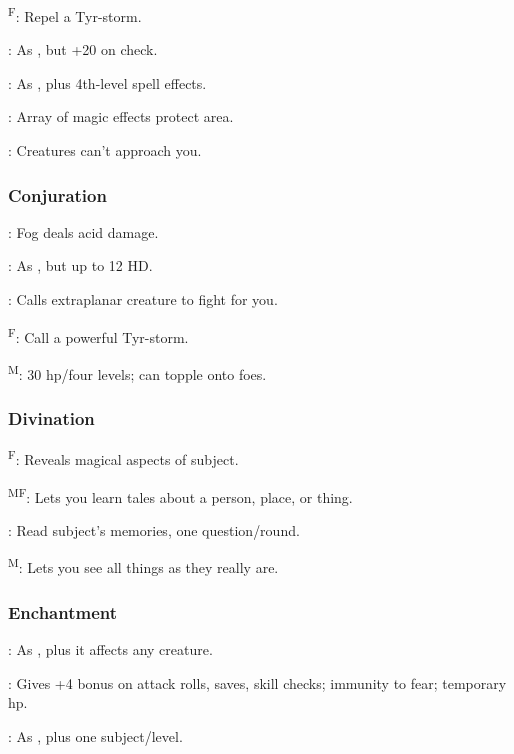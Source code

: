 	\textsuperscript{F}: Repel a Tyr-storm. %

	: As , but +20 on check.

	: As , plus 4th-level spell effects.

	: Array of magic effects protect area.

	: Creatures can't approach you.

\subsubsection{Conjuration}
	: Fog deals acid damage.

	: As , but up to 12 HD.

	: Calls extraplanar creature to fight for you.

	\textsuperscript{F}: Call a powerful Tyr-storm. %

	\textsuperscript{M}: 30 hp/four levels; can topple onto foes.

\subsubsection{Divination}
	\textsuperscript{F}: Reveals magical aspects of subject.

	\textsuperscript{MF}: Lets you learn tales about a person, place, or thing.

	: Read subject's memories, one question/round.

	\textsuperscript{M}: Lets you see all things as they really are.

\subsubsection{Enchantment}
	: As , plus it affects any creature.

	: Gives +4 bonus on attack rolls, saves, skill checks; immunity to fear; temporary hp.

	: As , plus one subject/level.

